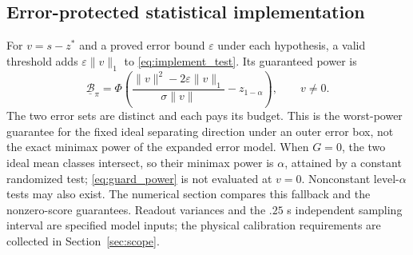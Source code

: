 \subsection{Error-protected statistical implementation}
For $v=s-z^*$ and a proved error bound $\varepsilon$ under each hypothesis, a valid threshold adds $\varepsilon\|v\|_1$ to \eqref{eq:implement_test}. Its guaranteed power is
\begin{equation}
 \underline{\mathcal B}_\pi=
 \Phi\!\left(\frac{\|v\|^2-2\varepsilon\|v\|_1}{\sigma\|v\|}
 -z_{1-\alpha}\right),\qquad v\ne0.
 \label{eq:guard_power}
\end{equation}
The two error sets are distinct and each pays its budget. This is the worst-power guarantee for the fixed ideal separating direction under an outer error box, not the exact minimax power of the expanded error model. When $G=0$, the two ideal mean classes intersect, so their minimax power is $\alpha$, attained by a constant randomized test; \eqref{eq:guard_power} is not evaluated at $v=0$. Nonconstant level-$\alpha$ tests may also exist. The numerical section compares this fallback and the nonzero-score guarantees. Readout variances and the $.25$ s independent sampling interval are specified model inputs; the physical calibration requirements are collected in Section~\ref{sec:scope}.
